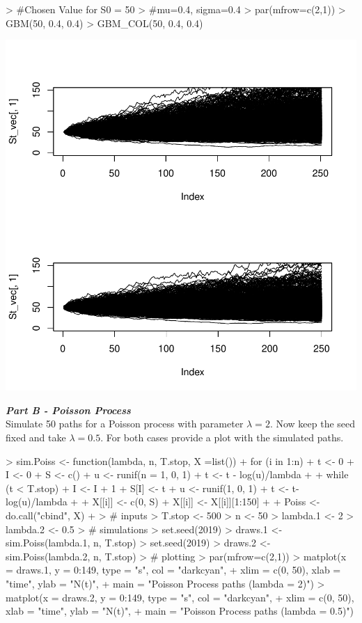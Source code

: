 \documentclass{article}
\begin{document}
\begin{Schunk}
\begin{Sinput}
> #Chosen Value for S0 = 50
> #mu=0.4, sigma=0.4
> par(mfrow=c(2,1))
> GBM(50, 0.4, 0.4)
> GBM_COL(50, 0.4, 0.4)
\end{Sinput}
\end{Schunk}
\includegraphics{HW2_Ex_1-5_V02-003}


\textbf{\textit{Part B - Poisson Process}} \\

Simulate 50 paths for a Poisson process with parameter $\lambda = 2$. Now keep the seed fixed and take $\lambda = 0.5$. For both cases provide a plot with the simulated paths.

\begin{Schunk}
\begin{Sinput}
> sim.Poiss <- function(lambda, n, T.stop, X =list()) {
+   for (i in 1:n) {
+     t <- 0
+     I <- 0
+     S <- c()
+     u <- runif(n = 1, 0, 1)
+     t <- t - log(u)/lambda
+     
+     while (t < T.stop) {
+       I <- I + 1
+       S[I] <- t
+       u <- runif(1, 0, 1)
+       t <- t-log(u)/lambda
+     }
+     X[[i]] <- c(0, S)
+     X[[i]] <- X[[i]][1:150]
+   }
+   Poiss <- do.call("cbind", X)
+ } 
> # inputs
> T.stop <- 500
> n <- 50
> lambda.1 <- 2
> lambda.2 <- 0.5
> # simulations
> set.seed(2019)
> draws.1 <- sim.Poiss(lambda.1, n, T.stop)
> set.seed(2019)
> draws.2 <- sim.Poiss(lambda.2, n, T.stop)
> # plotting
> par(mfrow=c(2,1))
> matplot(x = draws.1, y = 0:149, type = "s", col = "darkcyan",
+         xlim = c(0, 50), xlab = "time", ylab = "N(t)",
+         main = "Poisson Process paths (lambda = 2)")
> matplot(x = draws.2, y = 0:149, type = "s", col = "darkcyan",
+         xlim = c(0, 50), xlab = "time", ylab = "N(t)",
+         main = "Poisson Process paths (lambda = 0.5)")
\end{Sinput}
\end{Schunk}
\end{document}
